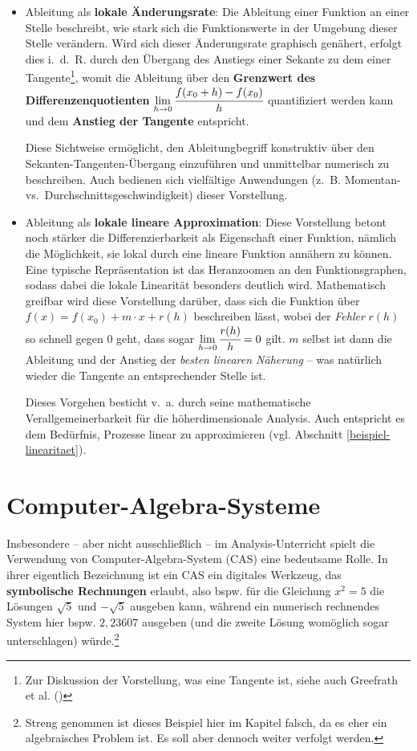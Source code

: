 \documentclass[
]{scrbook}
\theoremstyle{definition}
\theoremstyle{definition}
\theoremstyle{definition}
\theoremstyle{definition}
\theoremstyle{remark}
\begin{document}
\begin{itemize}
\item
  Ableitung als \textbf{lokale Änderungsrate}: Die Ableitung einer Funktion an einer Stelle beschreibt, wie stark sich die Funktionswerte in der Umgebung dieser Stelle verändern. Wird sich dieser Änderungsrate graphisch genähert, erfolgt dies i.~d.~R. durch den Übergang des Anstiegs einer Sekante zu dem einer Tangente\footnote{Zur Diskussion der Vorstellung, was eine Tangente ist, siehe auch Greefrath et al. ()}, womit die Ableitung über den \textbf{Grenzwert des Differenzenquotienten} \(\lim\limits_{h\rightarrow 0}\cfrac{f(x_0+h)-f(x_0)}{h}\) quantifiziert werden kann und dem \textbf{Anstieg der Tangente} entspricht.

  Diese Sichtweise ermöglicht, den Ableitungbegriff konstruktiv über den Sekanten-Tangenten-Übergang einzuführen und unmittelbar numerisch zu beschreiben. Auch bedienen sich vielfältige Anwendungen (z.~B. Momentan- vs.~Durchschnittsgeschwindigkeit) dieser Vorstellung.
\item
  Ableitung als \textbf{lokale lineare Approximation}: Diese Vorstellung betont noch stärker die Differenzierbarkeit als Eigenschaft einer Funktion, nämlich die Möglichkeit, sie lokal durch eine lineare Funktion annähern zu können. Eine typische Repräsentation ist das Heranzoomen an den Funktionsgraphen, sodass dabei die lokale Linearität besonders deutlich wird. Mathematisch greifbar wird diese Vorstellung darüber, dass sich die Funktion über \(f(x) = f(x_0) + m\cdot x+ r(h)\) beschreiben lässt, wobei der \emph{Fehler} \(r(h)\) so schnell gegen \(0\) geht, dass sogar \(\lim\limits_{h\rightarrow 0}\cfrac{r(h)}{h}=0\) gilt. \(m\) selbst ist dann die Ableitung und der Anstieg der \emph{besten linearen Näherung} -- was natürlich wieder die Tangente an entsprechender Stelle ist.

  Dieses Vorgehen besticht v.~a. durch seine mathematische Verallgemeinerbarkeit für die höherdimensionale Analysis. Auch entspricht es dem Bedürfnis, Prozesse linear zu approximieren (vgl. Abschnitt \ref{beispiel-linearitaet}).
\end{itemize}

\section{Computer-Algebra-Systeme}\label{computer-algebra-systeme}

Insbesondere -- aber nicht ausschließlich -- im Analysis-Unterricht spielt die Verwendung von Computer-Algebra-System (CAS) eine bedeutsame Rolle. In ihrer eigentlich Bezeichnung ist ein CAS ein digitales Werkzeug, das \textbf{symbolische Rechnungen} erlaubt, also bspw. für die Gleichung \(x^2 = 5\) die Lösungen \(\sqrt{5}\) und \(-\sqrt{5}\) ausgeben kann, während ein numerisch rechnendes System hier bspw. \(2,23607\) ausgeben (und die zweite Lösung womöglich sogar unterschlagen) würde.\footnote{Streng genommen ist dieses Beispiel hier im Kapitel falsch, da es eher ein algebraisches Problem ist. Es soll aber dennoch weiter verfolgt werden.}
\end{document}
